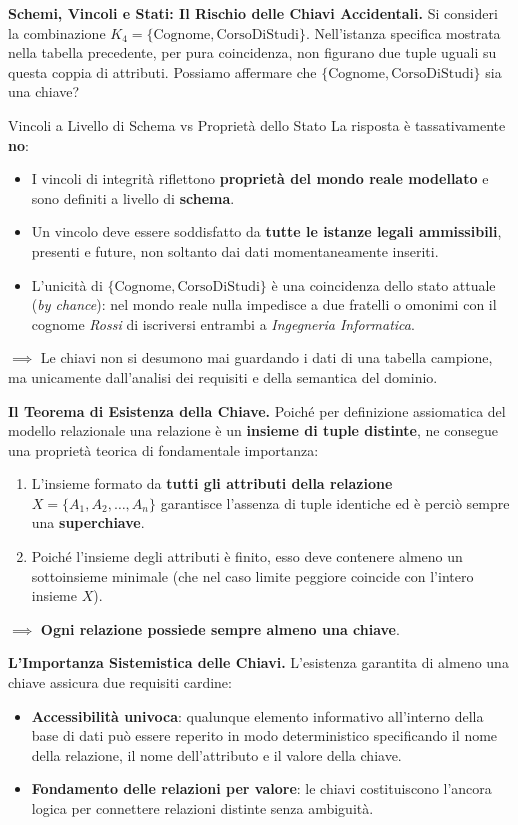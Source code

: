 \documentclass[12pt]{extarticle}
\begin{document}
\medskip
\noindent \textbf{Schemi, Vincoli e Stati: Il Rischio delle Chiavi Accidentali.} Si consideri la combinazione $K_4 = \{\text{Cognome}, \text{CorsoDiStudi}\}$. Nell'istanza specifica mostrata nella tabella precedente, per pura coincidenza, non figurano due tuple uguali su questa coppia di attributi. Possiamo affermare che $\{\text{Cognome}, \text{CorsoDiStudi}\}$ sia una chiave?

\begin{cbox}{Vincoli a Livello di Schema vs Proprietà dello Stato}
\noindent La risposta è tassativamente \textbf{no}:
\begin{itemize}
    \item I vincoli di integrità riflettono \textbf{proprietà del mondo reale modellato} e sono definiti a livello di \textbf{schema}.
    \item Un vincolo deve essere soddisfatto da \textbf{tutte le istanze legali ammissibili}, presenti e future, non soltanto dai dati momentaneamente inseriti.
    \item L'unicità di $\{\text{Cognome}, \text{CorsoDiStudi}\}$ è una coincidenza dello stato attuale (\textit{by chance}): nel mondo reale nulla impedisce a due fratelli o omonimi con il cognome \textit{Rossi} di iscriversi entrambi a \textit{Ingegneria Informatica}.
\end{itemize}
$\implies$ Le chiavi non si desumono mai guardando i dati di una tabella campione, ma unicamente dall'analisi dei requisiti e della semantica del dominio.
\end{cbox}

\medskip
\noindent \textbf{Il Teorema di Esistenza della Chiave.} Poiché per definizione assiomatica del modello relazionale una relazione è un \textbf{insieme di tuple distinte}, ne consegue una proprietà teorica di fondamentale importanza:
\begin{enumerate}
    \item L'insieme formato da \textbf{tutti gli attributi della relazione} $X = \{A_1, A_2, \dots, A_n\}$ garantisce l'assenza di tuple identiche ed è perciò sempre una \textbf{superchiave}.
    \item Poiché l'insieme degli attributi è finito, esso deve contenere almeno un sottoinsieme minimale (che nel caso limite peggiore coincide con l'intero insieme $X$).
\end{enumerate}
$\implies$ \textbf{Ogni relazione possiede sempre almeno una chiave}.

\medskip
\noindent \textbf{L'Importanza Sistemistica delle Chiavi.} L'esistenza garantita di almeno una chiave assicura due requisiti cardine:
\begin{itemize}
    \item \textbf{Accessibilità univoca}: qualunque elemento informativo all'interno della base di dati può essere reperito in modo deterministico specificando il nome della relazione, il nome dell'attributo e il valore della chiave.
    \item \textbf{Fondamento delle relazioni per valore}: le chiavi costituiscono l'ancora logica per connettere relazioni distinte senza ambiguità.
\end{itemize}
\end{document}
